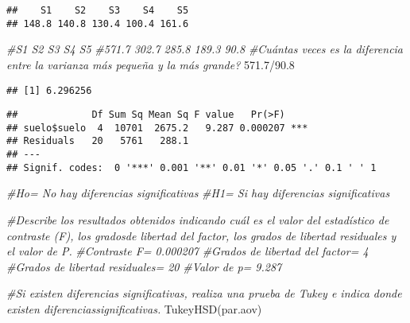 \documentclass[
]{article}
\newenvironment{Shaded}{\begin{snugshade}}{\end{snugshade}}
\newcommand{\CommentTok}[1]{\textcolor[rgb]{0.56,0.35,0.01}{\textit{#1}}}
\newcommand{\FloatTok}[1]{\textcolor[rgb]{0.00,0.00,0.81}{#1}}
\newcommand{\FunctionTok}[1]{\textcolor[rgb]{0.00,0.00,0.00}{#1}}
\newcommand{\NormalTok}[1]{#1}
\newcommand{\OtherTok}[1]{\textcolor[rgb]{0.56,0.35,0.01}{#1}}
\newcommand{\SpecialCharTok}[1]{\textcolor[rgb]{0.00,0.00,0.00}{#1}}
\begin{document}
\begin{verbatim}
##    S1    S2    S3    S4    S5 
## 148.8 140.8 130.4 100.4 161.6
\end{verbatim}

\begin{Shaded}
\begin{Highlighting}[]
\CommentTok{\#S1    S2    S3    S4    S5 }
\CommentTok{\#571.7 302.7 285.8 189.3  90.8}
\CommentTok{\#Cuántas veces es la diferencia entre la varianza más pequeña y la más grande?}
\FloatTok{571.7}\SpecialCharTok{/}\FloatTok{90.8}
\end{Highlighting}
\end{Shaded}

\begin{verbatim}
## [1] 6.296256
\end{verbatim}

\begin{Shaded}
\end{Shaded}

\begin{verbatim}
##             Df Sum Sq Mean Sq F value   Pr(>F)    
## suelo$suelo  4  10701  2675.2   9.287 0.000207 ***
## Residuals   20   5761   288.1                     
## ---
## Signif. codes:  0 '***' 0.001 '**' 0.01 '*' 0.05 '.' 0.1 ' ' 1
\end{verbatim}

\begin{Shaded}
\begin{Highlighting}[]
\CommentTok{\#Ho= No hay diferencias significativas}
\CommentTok{\#H1= Si hay diferencias significativas }

\CommentTok{\#Describe los resultados obtenidos indicando cuál es el valor del estadístico de contraste (F), los gradosde libertad del factor, los grados de libertad residuales y el valor de P.}
\CommentTok{\#Contraste F= 0.000207}
\CommentTok{\#Grados de libertad del factor= 4}
\CommentTok{\#Grados de libertad residuales= 20}
\CommentTok{\#Valor de p= 9.287}



\CommentTok{\#Si existen diferencias significativas, realiza una prueba de Tukey e indica donde existen diferenciassignificativas.}
\FunctionTok{TukeyHSD}\NormalTok{(par.aov)}
\end{Highlighting}
\end{Shaded}
\end{document}
